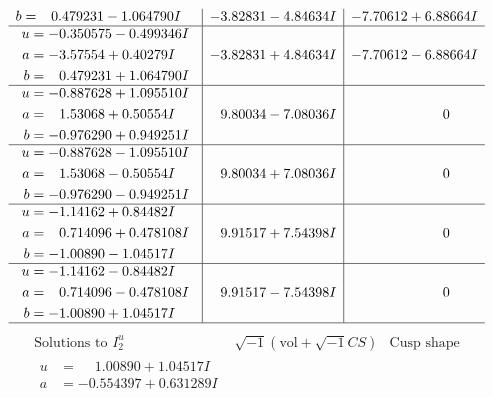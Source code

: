 \documentclass[1p]{elsarticle_modified}
\theoremstyle{definition}
\newcommand{\I}{\sqrt{-1}}
\begin{document}
$$\begin{array}{c|c|c}
\begin{aligned}
b &= \phantom{-}0.479231 - 1.064790 I\end{aligned}
 & -3.82831 - 4.84634 I & -7.70612 + 6.88664 I \\ \hline\begin{aligned}
u &= -0.350575 - 0.499346 I \\
a &= -3.57554 + 0.40279 I \\
b &= \phantom{-}0.479231 + 1.064790 I\end{aligned}
 & -3.82831 + 4.84634 I & -7.70612 - 6.88664 I \\ \hline\begin{aligned}
u &= -0.887628 + 1.095510 I \\
a &= \phantom{-}1.53068 + 0.50554 I \\
b &= -0.976290 + 0.949251 I\end{aligned}
 & \phantom{-}9.80034 - 7.08036 I & \phantom{-0.000000 } 0 \\ \hline\begin{aligned}
u &= -0.887628 - 1.095510 I \\
a &= \phantom{-}1.53068 - 0.50554 I \\
b &= -0.976290 - 0.949251 I\end{aligned}
 & \phantom{-}9.80034 + 7.08036 I & \phantom{-0.000000 } 0 \\ \hline\begin{aligned}
u &= -1.14162 + 0.84482 I \\
a &= \phantom{-}0.714096 + 0.478108 I \\
b &= -1.00890 - 1.04517 I\end{aligned}
 & \phantom{-}9.91517 + 7.54398 I & \phantom{-0.000000 } 0 \\ \hline\begin{aligned}
u &= -1.14162 - 0.84482 I \\
a &= \phantom{-}0.714096 - 0.478108 I \\
b &= -1.00890 + 1.04517 I\end{aligned}
 & \phantom{-}9.91517 - 7.54398 I & \phantom{-0.000000 } 0\\
 \hline 
 \end{array}$$\newpage$$\begin{array}{c|c|c}  
\text{Solutions to }I^u_{2}& \I (\text{vol} + \sqrt{-1}CS) & \text{Cusp shape}\\
 \hline 
\begin{aligned}
u &= \phantom{-}1.00890 + 1.04517 I \\
a &= -0.554397 + 0.631289 I \\

\end{aligned}
\end{array}$$
\end{document}
